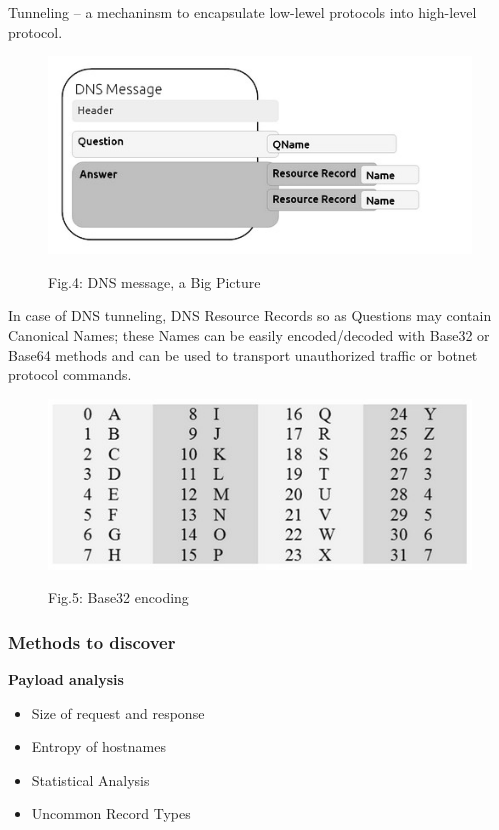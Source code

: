 \documentclass[10pt, a5paper]{article}
\begin{document}
Tunneling -- a mechaninsm to encapsulate low-lewel protocols into high-level protocol.
\begin{figure}[h!]
  \centering 
  \includegraphics[scale=0.8]{16_2015_fig4}
    
  Fig.4: DNS message, a Big Picture
\end{figure}

In case of DNS tunneling, DNS Resource Records so as Questions may contain Canonical Names; these Names can be easily encoded/de\-coded with Base32 or Base64 methods and can be used to transport unauthorized traffic or botnet protocol commands.

\begin{figure}[h!]
  \centering 
  \includegraphics[scale=0.8]{16_2015_fig5}
    
  Fig.5: Base32 encoding
\end{figure}


\subsubsection*{Methods to discover}

\textbf{Payload analysis}

\begin{itemize}
  \item Size of request and response
  \item Entropy of hostnames
  \item Statistical Analysis
  \item Uncommon Record Types
\end{itemize}
\end{document}
